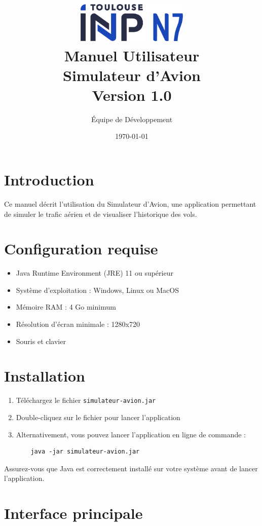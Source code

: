 \documentclass[12pt,a4paper]{article}
\title{
    \includegraphics[width=0.4\textwidth]{n7.png}\\[1cm]
    \Huge\textbf{Manuel Utilisateur}\\[0.5cm]
    \Large\textbf{Simulateur d'Avion}\\[0.5cm]
    \large Version 1.0
}
\author{Équipe de Développement}
\date{\today}
\begin{document}
\maketitle
\thispagestyle{empty}

\tableofcontents
\newpage

\section{Introduction}
Ce manuel décrit l'utilisation du Simulateur d'Avion, une application permettant de simuler le trafic aérien et de visualiser l'historique des vols.

\section{Configuration requise}
\begin{itemize}
    \item Java Runtime Environment (JRE) 11 ou supérieur
    \item Système d'exploitation : Windows, Linux ou MacOS
    \item Mémoire RAM : 4 Go minimum
    \item Résolution d'écran minimale : 1280x720
    \item Souris et clavier
\end{itemize}

\section{Installation}
\begin{enumerate}
    \item Téléchargez le fichier \texttt{simulateur-avion.jar}
    \item Double-cliquez sur le fichier pour lancer l'application
    \item Alternativement, vous pouvez lancer l'application en ligne de commande :
    \begin{verbatim}
    java -jar simulateur-avion.jar
    \end{verbatim}
\end{enumerate}

\begin{tcolorbox}[note]
Assurez-vous que Java est correctement installé sur votre système avant de lancer l'application.
\end{tcolorbox}

\section{Interface principale}
\end{document}
